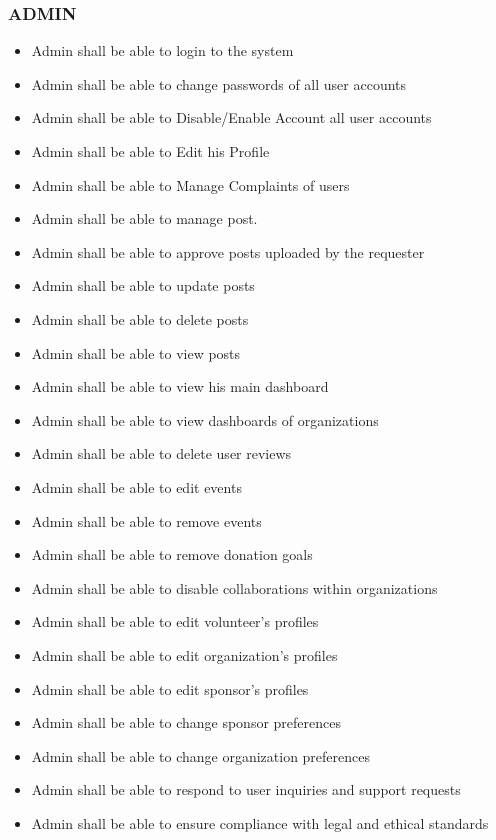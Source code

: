 
\subsubsection*{ADMIN}
\begin{itemize}
\itemsep0em 
    \item Admin shall be able to login to the system
    \item Admin shall be able to change passwords of all user accounts
    \item Admin shall be able to Disable/Enable Account all user accounts
    \item Admin shall be able to Edit his Profile
    \item Admin shall be able to Manage Complaints of users
    \item Admin shall be able to manage post.
    \item Admin shall be able to approve posts uploaded by the requester
    \item Admin shall be able to update posts
    \item Admin shall be able to delete posts
    \item Admin shall be able to view posts
    \item Admin shall be able to view his main dashboard
    \item Admin shall be able to view dashboards of organizations
    \item Admin shall be able to delete user reviews
    \item Admin shall be able to edit events
    \item Admin shall be able to remove events
    \item Admin shall be able to remove donation goals
    \item Admin shall be able to disable collaborations within organizations
    \item Admin shall be able to edit volunteer's profiles
    \item Admin shall be able to edit organization's profiles
    \item Admin shall be able to edit sponsor's profiles
    \item Admin shall be able to change sponsor preferences 
    \item Admin shall be able to change organization preferences
    \item Admin shall be able to respond to user inquiries and support requests
    \item Admin shall be able to ensure compliance with legal and ethical standards
\end{itemize}
\newpage
